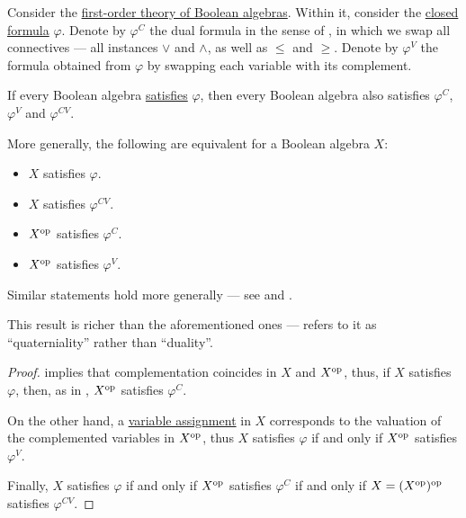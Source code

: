 \begin{theorem}\label{thm:boolean_algebra_duality}
  Consider the \hyperref[def:lattice/theory]{first-order theory of Boolean algebras}. Within it, consider the \hyperref[def:first_order_syntax/closed_formula]{closed formula} \( \varphi \). Denote by \( \varphi^C \) the dual formula in the sense of , in which we swap all connectives --- all instances \( \vee \) and \( \wedge \), as well as \( \leq \) and \( \geq \). Denote by \( \varphi^V \) the formula obtained from \( \varphi \) by swapping each variable with its complement.

  If every Boolean algebra \hyperref[def:first_order_model]{satisfies} \( \varphi \), then every Boolean algebra also satisfies \( \varphi^C \), \( \varphi^V \) and \( \varphi^{CV} \).

  More generally, the following are equivalent for a Boolean algebra \( X \):
  \begin{TwoColumns}
    \begin{itemize}
      \item \( X \) satisfies \( \varphi \).
      \item \( X \) satisfies \( \varphi^{CV} \).
    \end{itemize}
    \BeginSecondColumn
    \begin{itemize}
      \item \( X^{\operatorname{op}} \) satisfies \( \varphi^C \).
      \item \( X^{\operatorname{op}} \) satisfies \( \varphi^V \).
    \end{itemize}
  \end{TwoColumns}
\end{theorem}
\begin{comments}
  \item Similar statements hold more generally --- see  and .

  \item This result is richer than the aforementioned ones ---  refers to it as \enquote{quaterniality} rather than \enquote{duality}.
\end{comments}
\begin{proof}
   implies that complementation coincides in \( X \) and \( X^{\operatorname{op}} \), thus, if \( X \) satisfies \( \varphi \), then, as in , \( X^{\operatorname{op}} \) satisfies \( \varphi^C \).

  On the other hand, a \hyperref[def:first_order_valuation/variable_assignment]{variable assignment} in \( X \) corresponds to the valuation of the complemented variables in \( X^{\operatorname{op}} \), thus \( X \) satisfies \( \varphi \) if and only if \( X^{\operatorname{op}} \) satisfies \( \varphi^V \).

  Finally, \( X \) satisfies \( \varphi \) if and only if \( X^{\operatorname{op}} \) satisfies \( \varphi^C \) if and only if \( X = (X^{\operatorname{op}})^{\operatorname{op}} \) satisfies \( \varphi^{CV} \).
\end{proof}

